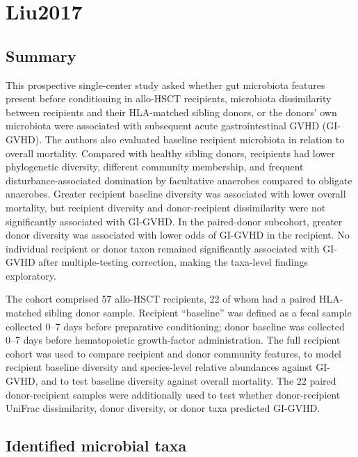 \documentclass[11pt,a4paper]{article}
\begin{document}
\section{Liu2017}
\subsection{Summary}

This prospective single-center study asked whether gut microbiota features present before conditioning in allo-HSCT recipients, microbiota dissimilarity between recipients and their HLA-matched sibling donors, or the donors' own microbiota were associated with subsequent acute gastrointestinal GVHD (GI-GVHD). The authors also evaluated baseline recipient microbiota in relation to overall mortality. Compared with healthy sibling donors, recipients had lower phylogenetic diversity, different community membership, and frequent disturbance-associated domination by facultative anaerobes compared to obligate anaerobes. Greater recipient baseline diversity was associated with lower overall mortality, but recipient diversity and donor-recipient dissimilarity were not significantly associated with GI-GVHD. In the paired-donor subcohort, greater donor diversity was associated with lower odds of GI-GVHD in the recipient. No individual recipient or donor taxon remained significantly associated with GI-GVHD after multiple-testing correction, making the taxa-level findings exploratory.
\par

The cohort comprised 57 allo-HSCT recipients, 22 of whom had a paired HLA-matched sibling donor sample. Recipient ``baseline'' was defined as a fecal sample collected 0--7 days before preparative conditioning; donor baseline was collected 0--7 days before hematopoietic growth-factor administration. The full recipient cohort was used to compare recipient and donor community features, to model recipient baseline diversity and species-level relative abundances against GI-GVHD, and to test baseline diversity against overall mortality. The 22 paired donor-recipient samples were additionally used to test whether donor-recipient UniFrac dissimilarity, donor diversity, or donor taxa predicted GI-GVHD.
\par


\subsection{Identified microbial taxa}
\end{document}
